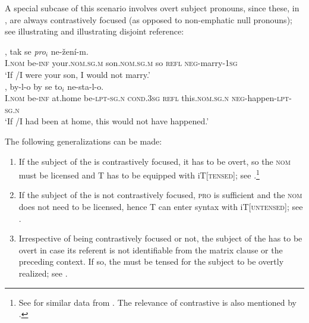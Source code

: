 \documentclass[output=paper,colorlinks,citecolor=brown,newtxmath]{langsci/langscibook}
\begin{document}
\begin{itemize}
\noindent A special subcase of this scenario involves overt subject pronouns, since these, in , are always contrastively focused (as opposed to non-em\-phat\-ic null pronouns); see  illustrating  and  illustrating disjoint reference:

\ea\label{ex:son}
\ea\label{ex:son-a}
, tak se \textit{pro}$_i$ ne-žení-m.\\
	{} I.\textsc{nom} be-\textsc{inf} your.\textsc{nom.sg.m} son.\textsc{nom.sg.m} so \textsc{refl} {} \textsc{neg}-marry-\textsc{1sg} \\
\glt `If /I were your son, I would not marry.'\\\xspace\hfill \citep[;][12]{Milotova2012}
\ex\label{ex:son-b}
, by-l-o by se to$_i$ ne-sta-l-o.\\
	{} I.\textsc{nom} be-\textsc{inf} {at.home} be-\textsc{lpt-sg.n} \textsc{cond.3sg} \textsc{refl} this.\textsc{nom.sg.n} \textsc{neg}-happen-\textsc{lpt-sg.n}\\
\glt `If /I had been at home, this would not have happened.'
\z
\z

\end{itemize}

\noindent The following generalizations can be made:

\begin{enumerate}

\item If the subject of the  is contrastively focused, it has to be overt, so the \textsc{nom} must be licensed and T has to be equipped with iT[\textsc{tensed}]; see .\footnote{See \citet{Szabolcsi2009} for similar data from . The relevance of contrastive  is also mentioned by \citet[513]{McFaddenSundaresan2018}.}

\item If the subject of the  is not contrastively focused, \textsc{pro} is sufficient and the \textsc{nom} does not need to be licensed, hence T can enter syntax with iT[\textsc{untensed}]; see .

\item Irrespective of being contrastively focused or not, the subject of the  has to be overt in case its referent is not identifiable from the matrix clause or the preceding context. If so, the  must be tensed for the subject to be overtly realized; see .

\end{enumerate}
\end{document}
